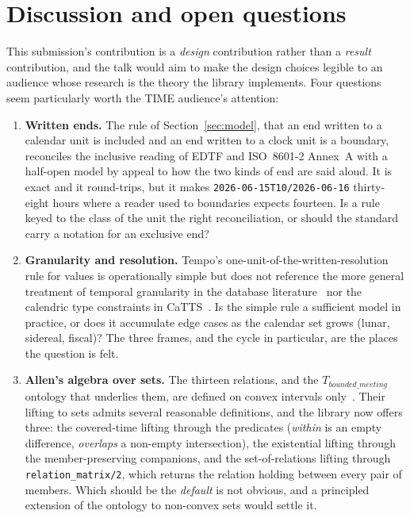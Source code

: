 \section{Discussion and open questions}
\label{sec:discussion}

This submission's contribution is a
\emph{design} contribution rather than a \emph{result} contribution,
and the talk would aim to make the design choices legible to an
audience whose research is the theory the library implements. Four
questions seem particularly worth the TIME audience's attention:

\begin{enumerate}
  \item \textbf{Written ends.} The rule of Section~\ref{sec:model},
    that an end written to a calendar unit is included and an end
    written to a clock unit is a boundary, reconciles the inclusive
    reading of EDTF and ISO~8601-2 Annex~A with a half-open model by
    appeal to how the two kinds of end are said aloud. It is exact
    and it round-trips, but it makes \texttt{2026-06-15T10/2026-06-16}
    thirty-eight hours where a reader used to boundaries expects
    fourteen. Is a rule keyed to the class of the unit the right
    reconciliation, or should the standard carry a notation for an
    exclusive end?

  \item \textbf{Granularity and resolution.} Tempo's
    one-unit-of-the-written-resolution rule for values is
    operationally simple but does not reference the more general
    treatment of temporal granularity in the database
    literature~\cite{bettini-granularities} nor the calendric type
    constraints in CaTTS~\cite{bry-spranger-multicalendar}. Is the
    simple rule a sufficient model in practice, or does it accumulate
    edge cases as the calendar set grows (lunar, sidereal, fiscal)?
    The three frames, and the cycle in particular, are the places the
    question is felt.

  \item \textbf{Allen's algebra over sets.} The thirteen
    relations, and the $T_{bounded\_meeting}$ ontology that
    underlies them, are defined on convex intervals
    only~\cite{gruninger2017allenontology}. Their lifting to sets
    admits several reasonable definitions, and the library now offers
    three: the covered-time lifting through the predicates
    (\emph{within} is an empty difference, \emph{overlaps} a
    non-empty intersection), the existential lifting through the
    member-preserving companions, and the set-of-relations lifting
    through \texttt{relation\_matrix/2}, which returns the relation
    holding between every pair of members. Which should be the
    \emph{default} is not obvious, and a principled extension of the
    ontology to non-convex sets would settle it.


\end{enumerate}
